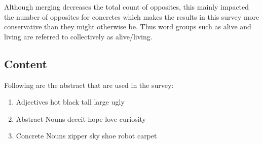Although merging decreases the total count of opposites, this mainly impacted the number of opposites for concretes which makes the results in this survey more conservative than they might otherwise be.  Thus word groups such as alive and living are referred to collectively as alive/living. 

\subsection{Content} Following are the abstract that are used in the survey:
	\begin {enumerate}
		\item Adjectives
			\subitem hot
			\subitem black
			\subitem tall
			\subitem large
			\subitem ugly
		\item Abstract Nouns
			\subitem deceit
			\subitem hope
			\subitem love
			\subitem curiosity
		\item Concrete Nouns
			\subitem zipper
			\subitem sky
			\subitem shoe
			\subitem robot
			\subitem carpet
	\end {enumerate}